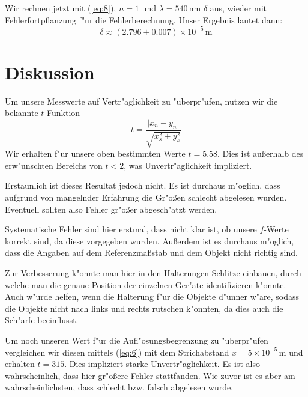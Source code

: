\documentclass[11pt,a4paper]{article}
\begin{document}
Wir rechnen jetzt mit (\ref{eq:8}), $n=1$ und $\lambda=540\,$nm $\delta$ aus, wieder mit Fehlerfortpflanzung f"ur die Fehlerberechnung. Unser Ergebnis lautet dann:
\[\delta\approx(2.796\pm0.007)\times10^{-5}\,\mathrm{m}\]

\section{Diskussion}

Um unsere Messwerte auf Vertr"aglichkeit zu "uberpr"ufen, nutzen wir die bekannte $t$-Funktion
\begin{equation}
t=\frac{\vert x_n-y_n\vert}{\sqrt{x_s^2+y_s^2}}\label{eq:6}
\end{equation}
Wir erhalten f"ur unsere oben bestimmten Werte $t=5.58$. Dies ist au\ss erhalb des erw"unschten Bereichs von $t<2$, was Unvertr"aglichkeit impliziert.

Erstaunlich ist dieses Resultat jedoch nicht. Es ist durchaus m"oglich, dass aufgrund von mangelnder Erfahrung die Gr"o\ss en schlecht abgelesen wurden. Eventuell sollten also Fehler gr"o\ss er abgesch"atzt werden.

Systematische Fehler sind hier erstmal, dass nicht klar ist, ob unsere $f$-Werte korrekt sind, da diese vorgegeben wurden. Au\ss erdem ist es durchaus m"oglich, dass die Angaben auf dem Referenzma\ss stab und dem Objekt nicht richtig sind. 

Zur Verbesserung k"onnte man hier in den Halterungen Schlitze einbauen, durch welche man die genaue Position der einzelnen Ger"ate identifizieren k"onnte. Auch w"urde helfen, wenn die Halterung f"ur die Objekte d"unner w"are, sodass die Objekte nicht nach links und rechts rutschen k"onnten, da dies auch die Sch"arfe beeinflusst.

Um noch unseren Wert f"ur die Aufl"osungsbegrenzung zu "uberpr"ufen vergleichen wir diesen mittels (\ref{eq:6}) mit dem Strichabstand $x=5\times10^{-5}\,$m und erhalten $t=315$. Dies impliziert starke Unvertr"aglichkeit. Es ist also wahrscheinlich, dass hier gr"o\ss ere Fehler stattfanden. Wie zuvor ist es aber am wahrscheinlichsten, dass schlecht bzw. falsch abgelesen wurde.

\vfill
\end{document}
